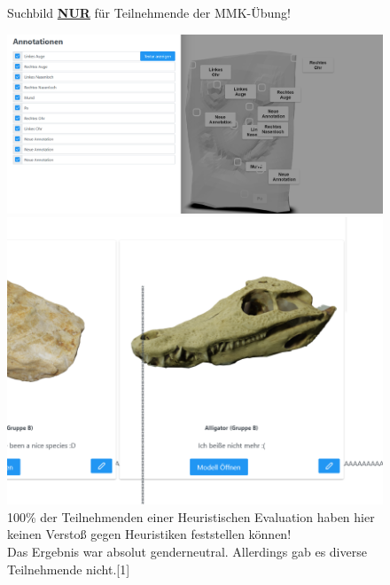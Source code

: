 \documentclass[12pt, aspectratio=169]{beamer}
\begin{document}
\begin{frame}
\begin{figure}
	Suchbild \underline{\textbf{NUR}} für Teilnehmende der MMK-Übung!
	\begin{minipage}[b]{0.45\linewidth}
		\centering
		\includegraphics[width=\textwidth]{image/Heur2.png}
	\end{minipage}
	\hspace{0.5cm}
	\begin{minipage}[b]{0.45\linewidth}
		\centering
		\includegraphics[width=\textwidth]{image/Heur1.png}
	\end{minipage}
	\caption{100\% der Teilnehmenden einer Heuristischen Evaluation haben hier keinen Verstoß gegen Heuristiken feststellen können!
	\ \\ Das Ergebnis war absolut genderneutral. Allerdings gab es diverse Teilnehmende nicht.\tiny{[1]}}
\end{figure}

\end{frame}
\end{document}
